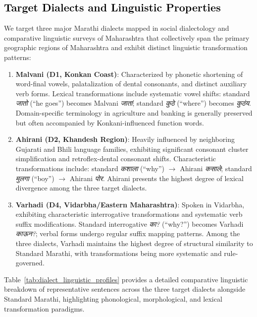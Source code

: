 \subsection{\textcolor{black}{Target Dialects and Linguistic Properties}}

We target three major Marathi dialects mapped in social dialectology and comparative linguistic surveys of Maharashtra \cite{kulkarni2023variation,tarfe2024comparative} that collectively span the primary geographic regions of Maharashtra and exhibit distinct linguistic transformation patterns:

\begin{enumerate}
    \item \textbf{Malvani (D1, Konkan Coast)}: Characterized by phonetic shortening of word-final vowels, palatalization of dental consonants, and distinct auxiliary verb forms. Lexical transformations include systematic vowel shifts: standard \emph{जातो} (``he goes'') becomes Malvani \emph{जातां}; standard \emph{कुठे} (``where'') becomes \emph{कुठंय}. Domain-specific terminology in agriculture and banking is generally preserved but often accompanied by Konkani-influenced function words.
    \item \textbf{Ahirani (D2, Khandesh Region)}: Heavily influenced by neighboring Gujarati and Bhili language families, exhibiting significant consonant cluster simplification and retroflex-dental consonant shifts. Characteristic transformations include: standard \emph{कशाला} (``why'') $\rightarrow$ Ahirani \emph{कसाले}; standard \emph{मुलगा} (``boy'') $\rightarrow$ Ahirani \emph{पोर}. Ahirani presents the highest degree of lexical divergence among the three target dialects.
    \item \textbf{Varhadi (D4, Vidarbha/Eastern Maharashtra)}: Spoken in Vidarbha, exhibiting characteristic interrogative transformations and systematic verb suffix modifications. Standard interrogative \emph{का?} (``why?'') becomes Varhadi \emph{काऊन?}; verbal forms undergo regular suffix mapping patterns. Among the three dialects, Varhadi maintains the highest degree of structural similarity to Standard Marathi, with transformations being more systematic and rule-governed.
\end{enumerate}

Table~\ref{tab:dialect_linguistic_profiles} provides a detailed comparative linguistic breakdown of representative sentences across the three target dialects alongside Standard Marathi, highlighting phonological, morphological, and lexical transformation paradigms.

